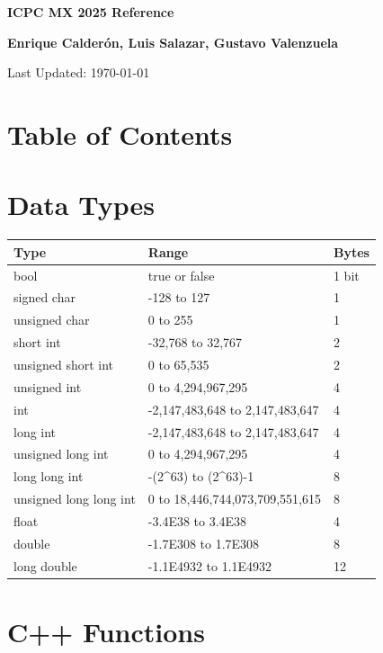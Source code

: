 \documentclass[10pt]{article}
\newcommand{\authorname}{\textbf{Enrique Calderón, Luis Salazar, Gustavo Valenzuela}}
\newcommand{\maketitlepage}{
    \begin{titlepage}
        \centering
        \vspace*{2cm}
        {\Huge\bfseries ICPC MX 2025 Reference\par}
        \vspace{1cm}
        {\Large \authorname \par}
        \vspace{2cm}
        {\large Last Updated: \today\par}
        \vfill
    \end{titlepage}
}
\begin{document}
\maketitlepage
\cleardoublepage

\section*{Table of Contents}
\begin{multicols*}{2}
    \startcontents[sections]
\end{multicols*}
\newpage

\begin{multicols*}{2}

\section{Data Types}
\begin{tabularx}{\linewidth}{|l|X|l|}
    \hline
    \textbf{Type} & \textbf{Range} & \textbf{Bytes} \\
    \hline
    bool & true or false & 1 bit \\
    \hline
    signed char & -128 to 127 & 1 \\
    \hline
    unsigned char & 0 to 255 & 1 \\
    \hline
    short int & -32,768 to 32,767 & 2 \\
    \hline
    unsigned short int & 0 to 65,535 & 2 \\
    \hline
    unsigned int & 0 to 4,294,967,295 & 4 \\
    \hline
    int & -2,147,483,648 to 2,147,483,647 & 4 \\
    \hline
    long int & -2,147,483,648 to 2,147,483,647 & 4 \\
    \hline
    unsigned long int & 0 to 4,294,967,295 & 4 \\
    \hline
    long long int & -(2\textasciicircum 63) to (2\textasciicircum 63)-1 & 8 \\
    \hline
    unsigned long long int & 0 to 18,446,744,073,709,551,615 & 8 \\
    \hline
    float & -3.4E38 to 3.4E38 & 4 \\
    \hline
    double & -1.7E308 to 1.7E308 & 8 \\
    \hline
    long double & -1.1E4932 to 1.1E4932 & 12 \\
    \hline
\end{tabularx}

\section{C++ Functions}

\end{multicols*}
\end{document}
